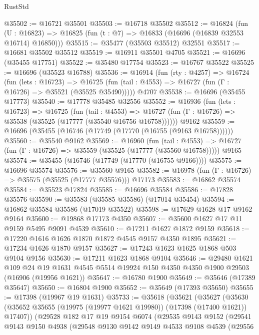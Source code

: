 \begin{lexlean}{RustStd}
\begin{coremodule}
@35502 := @16721 @35501
@35503 := @16718 @35502
@35512 := @16824
    (fun (U : @16823) => @16825 (fun (t : @7) => @16833 (@16696 (@16839 @32553 @16714) @16850)))
@35515 := @35477 (@35503 @35512) @32551
@35517 := @16681 @35502 @35512
@35519 := @16911 @35501 @4705
@35521 := @16696 (@35455 @17751)
@35522 := @35480 @17754
@35523 := @16767 @35522
@35525 := @16696 (@35523 @16788)
@35536 := @16914
    (fun (rty : @4257) =>
    @16724
      (fun (lets : @16723) =>
      @16725 (fun (tail : @4553) => @16727 (fun (Γ : @16726) => @35521 (@35525 @35490)))))
    @4707
@35538 := @16696 (@35455 @17773)
@35540 := @17778 @35485 @32556
@35552 := @16936
    (fun (lets : @16723) =>
    @16725
      (fun (tail : @4553) =>
      @16727 (fun (Γ : @16726) => @35538 (@35525 (@17777 (@35540 @16756 @16758))))))
    @9162
@35559 := @16696 (@35455 (@16746 (@17749 (@17770 (@16755 (@9163 @16758))))))
@35560 := @35540 @9162
@35569 := @16960
    (fun (tail : @4553) => @16727 (fun (Γ : @16726) => @35559 (@35525 (@17777 (@35560 @16758)))))
    @9165
@35574 := @35455 (@16746 (@17749 (@17770 (@16755 @9166))))
@35575 := @16696 @35574
@35576 := @35560 @9165
@35582 := @16978 (fun (Γ : @16726) => @35575 (@35525 (@17777 @35576))) @17173
@35583 := @16862 @35574
@35584 := @35523 @17824
@35585 := @16696 @35584
@35586 := @17828 @35576
@35590 := @35583 (@35585 @35586) (@17014 @35454)
@35594 := @16862 @35584 @35586 (@17019 @35522)
@35598 := @17629 @1628 @17 @9162 @9164
@35600 := @19868 @17173 @4350
@35607 := @35600 @1627 @17 @11 @9159 @5495 @9091 @4539
@35610 := @17211 @1627 @1872 @9159
@35618 := @17220 @1616 @1626 @1870 @1872 @4545 @9157 @4350 @1895
@35621 := @17234 @1626 @1870 @9157
@35627 := @17243 @1623 @1625 @1868 @503 @9104 @9156
@35630 := @17211 @1623 @1868 @9104
@35646 := @29480
    @1621
    @109
    @24
    @19
    @1631
    @4545
    @5514
    @19924
    @150
    @4350
    @4350
    @1900
    @29503
    (@16906 (@19956 @1621))
@35647 := @16780 @1900
@35649 := @35646 (@17389 @35647)
@35650 := @16804 @1900
@35652 := @35649 (@17393 @35650)
@35655 := @17398 (@19967 @19 @1631)
@35733 := @35618
    (@35621
      (@35627
        (@35630 (@35652 @35655 (@19975 (@19977 @1621 @19980)) (@17398 (@17400 @1621)) @17407))
        (@29528
          @182
          @17
          @19
          @9154
          @6074
          (@29535
            @9143
            @9152
            (@29541
              @9143
              @9150
              @4938
              (@29548
                @9130
                @9142
                @9149
                @4533
                @9108
                @4539
                (@29556

\end{coremodule}
\end{lexlean}
